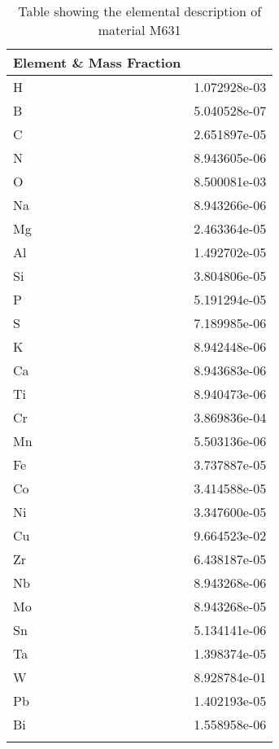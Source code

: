 \begin{centering}
\begin{longtable}[ht!]
{ p{} | p{} }
\hline
Element \& Mass Fraction\\
\hline
H &  1.072928e-03\\
B &  5.040528e-07\\
C &  2.651897e-05\\
N &  8.943605e-06\\
O &  8.500081e-03\\
Na &  8.943266e-06\\
Mg &  2.463364e-05\\
Al &  1.492702e-05\\
Si &  3.804806e-05\\
P &  5.191294e-05\\
S &  7.189985e-06\\
K &  8.942448e-06\\
Ca &  8.943683e-06\\
Ti &  8.940473e-06\\
Cr &  3.869836e-04\\
Mn &  5.503136e-06\\
Fe &  3.737887e-05\\
Co &  3.414588e-05\\
Ni &  3.347600e-05\\
Cu &  9.664523e-02\\
Zr &  6.438187e-05\\
Nb &  8.943268e-06\\
Mo &  8.943268e-05\\
Sn &  5.134141e-06\\
Ta &  1.398374e-05\\
W &  8.928784e-01\\
Pb &  1.402193e-05\\
Bi &  1.558958e-06\\
\caption{Table showing the elemental description of material M631}
\label{table:material_M631}
\end{longtable}
\clearpage


\end{centering}
